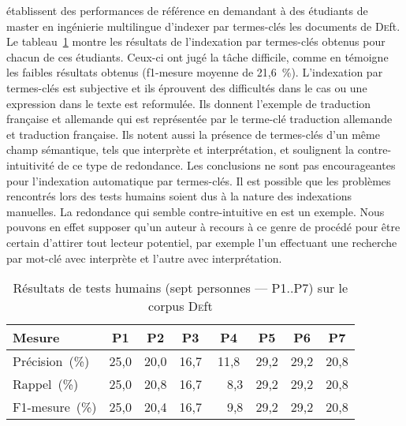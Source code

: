      établissent des performances de référence en
    demandant à des étudiants de master en ingénierie multilingue d'indexer par
    termes-clés les documents de \textsc{De}ft. Le
    tableau~\ref{tab:deft_human_tests} montre les résultats de l'indexation par
    termes-clés obtenus pour chacun de ces étudiants. Ceux-ci ont jugé la tâche
    difficile, comme en témoigne les faibles résultats obtenus (f1-mesure moyenne
    de 21,6~\%). L'indexation par termes-clés est subjective et ils éprouvent des
    difficultés dans le cas ou une expression dans le texte est reformulée. Ils
    donnent l'exemple de \og{}traduction française et allemande\fg{} qui est
    représentée par le terme-clé \og{}traduction allemande et traduction
    française\fg{}. Ils notent aussi la présence de termes-clés d'un même champ
    sémantique, tels que \og{}interprète\fg{} et \og{}interprétation\fg{}, et
    soulignent la contre-intuitivité de ce type de redondance. Les conclusions ne
    sont pas encourageantes pour l'indexation automatique par termes-clés. Il
    est possible que les problèmes rencontrés lors des tests humains soient dus
    à la nature des indexations manuelles. La redondance qui semble contre-intuitive en
    est un exemple. Nous pouvons en effet supposer qu'un auteur à recours à ce
    genre de procédé pour être certain d'attirer tout lecteur potentiel, par
    exemple l'un effectuant une recherche par mot-clé avec \og{}interprète\fg{}
    et l'autre avec \og{}interprétation\fg{}.
    \begin{table}[!h]
      \centering
      \begin{tabular}{l|ccccccc}
        \toprule
          \textbf{Mesure} & \textbf{P1} & \textbf{P2} & \textbf{P3} & \textbf{P4} & \textbf{P5} & \textbf{P6} & \textbf{P7}\\
        \hline
        Précision~\hfill(\%) & 25,0 & 20,0 & 16,7 & 11,8 & 29,2 & 29,2 & 20,8\\
        Rappel~\hfill(\%) & 25,0 & 20,8 & 16,7 & ~~8,3 & 29,2 & 29,2 & 20,8\\
        F1-mesure~\hfill(\%) & 25,0 & 20,4 & 16,7 & ~~9,8 & 29,2 & 29,2 & 20,8\\
        \bottomrule
      \end{tabular}
      \caption[Résultats de tests humains sur le corpus \textsc{De}ft]{
        Résultats de tests humains (sept personnes --- P1$..$P7) sur le corpus
        \textsc{De}ft
        \label{tab:deft_human_tests}
      }
    \end{table}

